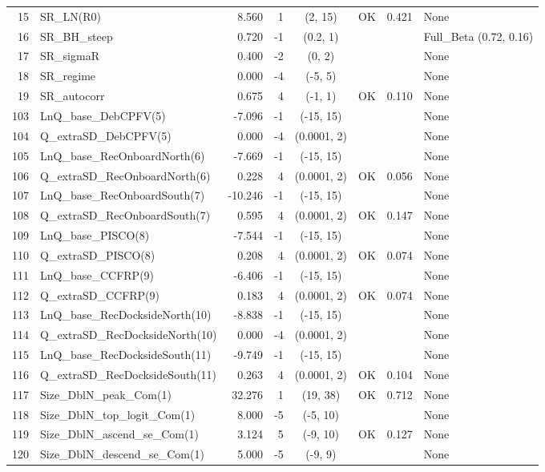 \documentclass[12pt,]{article}
\begin{document}
\begin{landscape}
\begin{longtable}{rlrrcccl}
  15 & SR\_LN(R0) & 8.560 & 1 & (2, 15) & OK & 0.421 & None \\ 
  16 & SR\_BH\_steep & 0.720 & -1 & (0.2, 1) &  &  & Full\_Beta (0.72, 0.16) \\ 
  17 & SR\_sigmaR & 0.400 & -2 & (0, 2) &  &  & None \\ 
  18 & SR\_regime & 0.000 & -4 & (-5, 5) &  &  & None \\ 
  19 & SR\_autocorr & 0.675 & 4 & (-1, 1) & OK & 0.110 & None \\ 
  103 & LnQ\_base\_DebCPFV(5) & -7.096 & -1 & (-15, 15) &  &  & None \\ 
  104 & Q\_extraSD\_DebCPFV(5) & 0.000 & -4 & (0.0001, 2) &  &  & None \\ 
  105 & LnQ\_base\_RecOnboardNorth(6) & -7.669 & -1 & (-15, 15) &  &  & None \\ 
  106 & Q\_extraSD\_RecOnboardNorth(6) & 0.228 & 4 & (0.0001, 2) & OK & 0.056 & None \\ 
  107 & LnQ\_base\_RecOnboardSouth(7) & -10.246 & -1 & (-15, 15) &  &  & None \\ 
  108 & Q\_extraSD\_RecOnboardSouth(7) & 0.595 & 4 & (0.0001, 2) & OK & 0.147 & None \\ 
  109 & LnQ\_base\_PISCO(8) & -7.544 & -1 & (-15, 15) &  &  & None \\ 
  110 & Q\_extraSD\_PISCO(8) & 0.208 & 4 & (0.0001, 2) & OK & 0.074 & None \\ 
  111 & LnQ\_base\_CCFRP(9) & -6.406 & -1 & (-15, 15) &  &  & None \\ 
  112 & Q\_extraSD\_CCFRP(9) & 0.183 & 4 & (0.0001, 2) & OK & 0.074 & None \\ 
  113 & LnQ\_base\_RecDocksideNorth(10) & -8.838 & -1 & (-15, 15) &  &  & None \\ 
  114 & Q\_extraSD\_RecDocksideNorth(10) & 0.000 & -4 & (0.0001, 2) &  &  & None \\ 
  115 & LnQ\_base\_RecDocksideSouth(11) & -9.749 & -1 & (-15, 15) &  &  & None \\ 
  116 & Q\_extraSD\_RecDocksideSouth(11) & 0.263 & 4 & (0.0001, 2) & OK & 0.104 & None \\ 
  117 & Size\_DblN\_peak\_Com(1) & 32.276 & 1 & (19, 38) & OK & 0.712 & None \\ 
  118 & Size\_DblN\_top\_logit\_Com(1) & 8.000 & -5 & (-5, 10) &  &  & None \\ 
  119 & Size\_DblN\_ascend\_se\_Com(1) & 3.124 & 5 & (-9, 10) & OK & 0.127 & None \\ 
  120 & Size\_DblN\_descend\_se\_Com(1) & 5.000 & -5 & (-9, 9) &  &  & None \\ 

\end{longtable}
\end{landscape}
\end{document}
